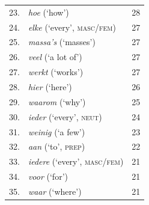 \documentclass[11pt]{article}
\begin{document}
\begin{table}[htbp]
{\begin{tabular}[t]{@{}lll@{}}
23. & \textit{hoe} (‘how’) & 28 \\
24. & \textit{elke} (‘every’, \textsc{masc/fem}) & 27 \\
25. & \textit{massa's} (‘masses’) & 27 \\
26. & \textit{veel} (‘a lot of’) & 27 \\
27. & \textit{werkt} (‘works’) & 27 \\
28. & \textit{hier} (‘here’) & 26 \\
29. & \textit{waarom} (‘why’) & 25 \\
30. & \textit{ieder} (‘every’, \textsc{neut}) & 24 \\
31. & \textit{weinig} (‘a few’) & 23 \\
32. & \textit{aan} (‘to’, \textsc{prep}) & 22 \\
33. & \textit{iedere} (‘every’, \textsc{masc/fem}) & 21 \\
34. & \textit{voor} (‘for’) & 21 \\
35. & \textit{waar} (‘where’) & 21 \\ \hline
\end{tabular}
}
\end{table}
\end{document}

